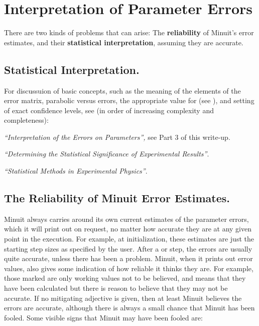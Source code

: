 \section{Interpretation of Parameter Errors}

There are two kinds of problems that can arise:
The {\bf reliability} of Minuit's error estimates, and their
{\bf statistical interpretation}, assuming they are accurate.

\subsection{Statistical Interpretation.}

For discussuion of basic concepts, such as the meaning of the elements
of the error matrix, parabolic versus  errors,
the appropriate value for  
(see ), and setting of exact
confidence levels, see (in order of increasing complexity and completeness):

\begin{UL}            
\item {\em ``Interpretation of the Errors on Parameters'',}
      see Part 3 of this write-up.
\item {\em ``Determining the Statistical Significance of Experimental
      Results''}\cite{bib-MIN81}.
\item {\em ``Statistical Methods in Experimental Physics''}\cite{bib-EADIE}.
\end{UL}

\subsection{The Reliability of Minuit Error Estimates.}

Minuit always carries around its own current estimates of the
parameter errors, which it will print out on request, no matter how
accurate they are at any given point in the execution.
For example, at initialization, these estimates are just the starting
step sizes as specified by the user.  
After a  or  step,
the errors are usually quite accurate, unless there has been a problem.
Minuit, when it prints out error values,
also gives some indication of how reliable it thinks they are.
For example, those marked  are only working values
not to be believed, and  means that they have been
calculated but there is reason to believe that they may not be accurate.
If no mitigating adjective is given, then at least Minuit believes
the errors are accurate, although there is always a small chance
that Minuit has been fooled.
Some visible signs that Minuit may have been fooled are:

